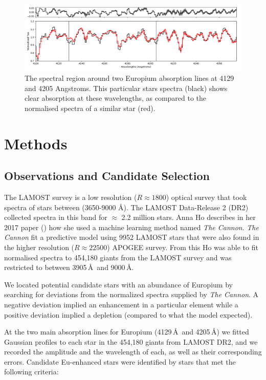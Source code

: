 \documentclass[a4paper,fleqn,usenatbib]{mnras}
\begin{document}
\begin{figure}
	\includegraphics[width=\columnwidth]{423451}
	\caption{The spectral region around two Europium absorption lines at 4129 and 4205 Angstroms. This particular stars spectra (black) shows clear absorption at these wavelengths, as compared to the normalised spectra of a similar star (red).}
	\label{fig:starindex_423451}
\end{figure}


\section{Methods}

\subsection{Observations and Candidate Selection}
The LAMOST survey is a low resolution ($R\approx1800$) optical survey that took spectra of stars between (3650-9000 \AA). The LAMOST Data-Release 2 (DR2) collected spectra in this band for $\approx$ 2.2 million stars. Anna Ho describes in her 2017 paper (\cite{AnnaHo2017}) how she used a machine learning method named \textit{The Cannon}. \textit{The Cannon} fit a predictive model using 9952 LAMOST stars that were also found in the higher resolution ($R\approx22500$) APOGEE survey. From this Ho was able to fit normalised spectra to 454,180 giants from the LAMOST survey and was restricted to between 3905\,\AA\ and 9000\,\AA.

We located potential candidate stars with an abundance of Europium by searching for deviations from the normalized spectra supplied by \textit{The Cannon}. A negative deviation implied an enhancement in a particular element while a positive deviation implied a depletion (compared to what the model expected). 

At the two main absorption lines for Europium (4129\,\AA\ and 4205\,\AA) we fitted Gaussian profiles to each star in the 454,180 giants from LAMOST DR2, and we recorded the amplitude and the wavelength of each, as well as their corresponding errors. Candidate Eu-enhanced stars were identified by stars that met the following criteria:
\end{document}
